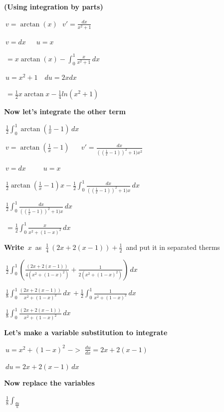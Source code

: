 \documentclass{article}
\begin{document}
\bigskip \textbf{(Using integration by parts)}

\bigskip $\ v= \arctan{(x)} \,\,\,\, v'=\frac{dx}{x^2+1} $\

\bigskip $\ v=dx \,\,\,\,\,\,\,\,\, u=x $\

\bigskip $\ =x\arctan{(x)}-\int_{0}^{1} \frac{x}{x^2+1}\,dx \,$

\bigskip $\ u= x^2+1 \,\,\,\,\,\, du= 2x dx $\ 

\bigskip  $\ =\frac{1}{2}x\arctan{x}-\frac{1}{4}ln(x^2+1) $\

\bigskip
\bigskip \textbf{Now let's integrate the other term} 

\bigskip $\ \frac{1}{2} \int_{0}^{1} \arctan{(\frac{1}{x}-1)} \,dx \, $\

\bigskip $\ v= \arctan{(\frac{1}{x}-1)}  \,\,\,\,\,\,\,\,\,\, v'=\frac{dx}{((\frac{1}{x}-1))^2+1)x^2} $\

\bigskip $\ v=dx \,\,\,\,\,\,\,\,\,\,\,\,\,\,\,u=x $\

\bigskip $\ \frac{1}{2} \arctan{(\frac{1}{x}-1)}x-\frac{1}{2} \int_{0}^{1} \frac{dx}{((\frac{1}{x}-1))^2+1)x} \,dx \, $\

\bigskip $\ \frac{1}{2} \int_{0}^{1} \frac{dx}{((\frac{1}{x}-1))^2+1)x} \,dx \, $\ 


\newpage

\bigskip $\ = \frac{1}{2} \int_{0}^{1} \frac{x}{x^2+(1-x)^2} \,dx \, $\ 

\bigskip \textbf{Write} $\ x $\ {as} $\ \frac{1}{4} \ (2x+2(x-1))+ \frac{1}{2} $\ {and put it in separated therms} 

\bigskip $\ \frac{1}{2} \int_{0}^{1} (\frac{(2x+2(x-1))}{4(x^2+(1-x)^2)} + \frac{1}{2(x^2+(1-x)^2)}) \,dx \,$\ 

\bigskip $\ \frac{1}{8} \int_{0}^{1} \frac{(2x+2(x-1))}{x^2+(1-x)^2}\,dx\, + \frac{1}{2} \int_{0}^{1}\frac{1}{x^2+(1-x)^2} \,dx \,$\ 

\bigskip

\bigskip $\ \frac{1}{8} \int_{0}^{1} \frac{(2x+2(x-1))}{x^2+(1-x)^2}\,dx\,$\ 

\bigskip \textbf{Let's make a variable substitution to integrate} 

\bigskip $\ u=x^2+(1-x)^2 \,\,->\,\, \frac {du}{dx}= 2x+2(x-1) \,\,$\ 

\bigskip $\ du=2x+2(x-1) \,dx\,$\

\bigskip \textbf{Now replace the variables} 

\bigskip $\ \frac{1}{8} \int_ \frac {du}{u} $\
\end{document}
